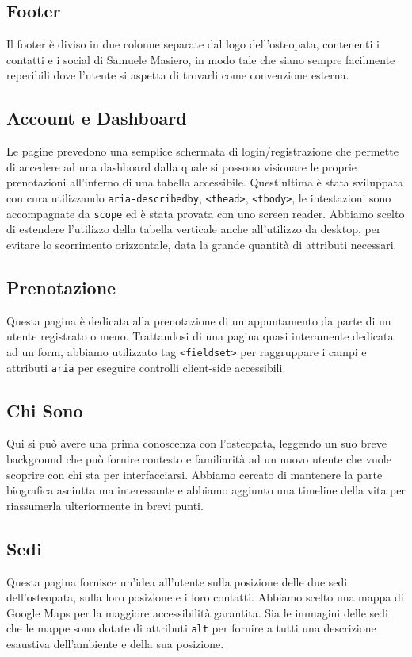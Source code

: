 \documentclass{article}
\begin{document}
\subsection{Footer}
Il footer è diviso in due colonne separate dal logo dell'osteopata, contenenti i contatti e i social di Samuele Masiero, in modo tale che siano sempre facilmente reperibili dove l'utente si aspetta di trovarli come convenzione esterna.
\subsection{Account e Dashboard} \label{dashboard}
Le pagine prevedono una semplice schermata di login/registrazione che permette di accedere ad una dashboard dalla quale si possono visionare le proprie prenotazioni all'interno di una tabella accessibile. Quest'ultima è stata sviluppata con cura utilizzando \verb|aria-describedby|, \verb|<thead>|, \verb|<tbody>|, le intestazioni sono accompagnate da \verb|scope| ed è stata provata con uno screen reader. Abbiamo scelto di estendere l'utilizzo della tabella verticale anche all'utilizzo da desktop, per evitare lo scorrimento orizzontale, data la grande quantità di attributi necessari.
\subsection{Prenotazione}
Questa pagina è dedicata alla prenotazione di un appuntamento da parte di un utente registrato o meno. Trattandosi di una pagina quasi interamente dedicata ad un form, abbiamo utilizzato tag \verb|<fieldset>| per raggruppare i campi e attributi \verb|aria| per eseguire controlli client-side accessibili.
\subsection{Chi Sono}
Qui si può avere una prima conoscenza con l'osteopata, leggendo un suo breve background che può fornire contesto e familiarità ad un nuovo utente che vuole scoprire con chi sta per interfacciarsi. Abbiamo cercato di mantenere la parte biografica asciutta ma interessante e abbiamo aggiunto una timeline della vita per riassumerla ulteriormente in brevi punti.
\subsection{Sedi}
Questa pagina fornisce un'idea all'utente sulla posizione delle due sedi dell'osteopata, sulla loro posizione e i loro contatti. Abbiamo scelto una mappa di Google Maps per la maggiore accessibilità garantita. Sia le immagini delle sedi che le mappe sono dotate di attributi \verb|alt| per fornire a tutti una descrizione esaustiva dell'ambiente e della sua posizione.
\end{document}

